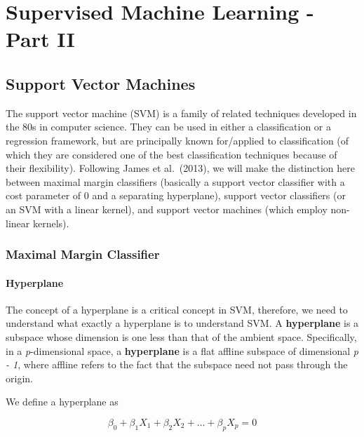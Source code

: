 \documentclass[
]{book}
\begin{document}
\hypertarget{supervised-machine-learning---part-ii}{%
\chapter{Supervised Machine Learning - Part II}\label{supervised-machine-learning---part-ii}}

\hypertarget{support-vector-machines}{%
\section{Support Vector Machines}\label{support-vector-machines}}

The support vector machine (SVM) is a family of related techniques developed in the 80s in computer science. They can be used in either a classification or a regression framework, but are principally known for/applied to classification (of which they are considered one of the best classification techniques because of their flexibility). Following James et al.~(2013), we will make the distinction here between maximal margin classifiers (basically a support vector classifier with a cost parameter of 0 and a separating hyperplane), support vector classifiers (or an SVM with a linear kernel), and support vector machines (which employ non-linear kernels).

\hypertarget{maximal-margin-classifier}{%
\subsection{Maximal Margin Classifier}\label{maximal-margin-classifier}}

\hypertarget{hyperplane}{%
\subsubsection{Hyperplane}\label{hyperplane}}

The concept of a hyperplane is a critical concept in SVM, therefore, we need to understand what exactly a hyperplane is to understand SVM. A \textbf{hyperplane} is a subspace whose dimension is one less than that of the ambient space. Specifically, in a \emph{p}-dimensional space, a \textbf{hyperplane} is a flat affline subspace of dimensional \emph{p - 1}, where affline refers to the fact that the subspace need not pass through the origin.

We define a hyperplane as

\[
\beta_0 + \beta_1X_1 + \beta_2X_2 + \dots + \beta_pX_p = 0
\]
\end{document}
